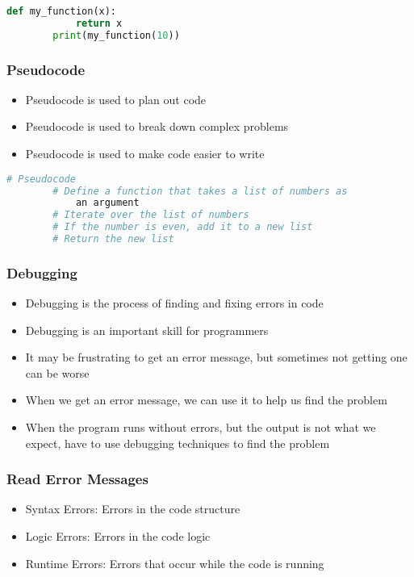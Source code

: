 \documentclass[serif, 9pt, aspectratio=32]{beamer}
\begin{document}
\begin{frame}[fragile]
    \begin{lstlisting}[language=Python]
        def my_function(x):
            return x
        print(my_function(10))
    \end{lstlisting}
\end{frame}

\begin{frame}
    \centering
    \frametitle{Pseudocode}
    \begin{itemize}
        \setlength{\itemsep}{3em}
        \item Pseudocode is used to plan out code
        \item Pseudocode is used to break down complex problems
        \item Pseudocode is used to make code easier to write
    \end{itemize}
\end{frame}

\begin{frame}[fragile]
    \begin{lstlisting}[language=Python]
        # Pseudocode
        # Define a function that takes a list of numbers as 
            an argument
        # Iterate over the list of numbers
        # If the number is even, add it to a new list
        # Return the new list
    \end{lstlisting}
\end{frame}

\begin{frame}
    \centering
    \frametitle{Debugging}
    \begin{itemize}
        \setlength{\itemsep}{3em}
        \item Debugging is the process of finding and fixing errors in code
        \item Debugging is an important skill for programmers
        \item It may be frustrating to get an error message, but sometimes not getting one can be worse
        \item When we get an error message, we can use it to help us find the problem
        \item When the program runs without errors, but the output is not what we expect, have to use debugging techniques to find the problem
    \end{itemize}
\end{frame}

\begin{frame}
    \centering
    \frametitle{Read Error Messages}
    \begin{itemize}
        \setlength{\itemsep}{3em}
        \item Syntax Errors: Errors in the code structure
        \item Logic Errors: Errors in the code logic
        \item Runtime Errors: Errors that occur while the code is running
    \end{itemize}
\end{frame}
\end{document}

